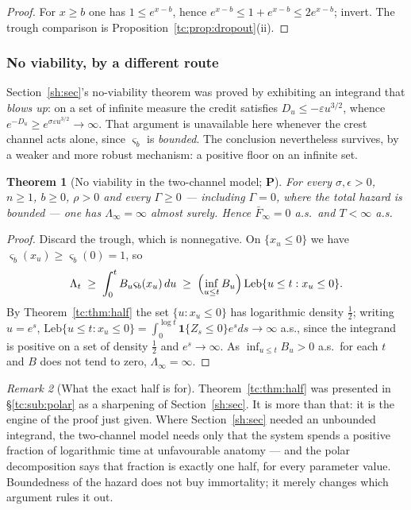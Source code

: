 \documentclass[11pt]{article}
\numberwithin{equation}{section}
\theoremstyle{plain}
\newtheorem{theorem}{Theorem}[section]
\theoremstyle{definition}
\theoremstyle{remark}
\newtheorem{remark}[theorem]{Remark}
\newcommand{\one}{\mathbf{1}}
\begin{document}
\begin{proof}
For $x\ge b$ one has $1\le e^{x-b}$, hence
$e^{x-b}\le1+e^{x-b}\le2e^{x-b}$; invert. The trough comparison is
Proposition~\ref{tc:prop:dropout}(ii).
\end{proof}

\subsubsection{No viability, by a different route}\label{tc:subsub:noviab}

Section~\ref{sh:sec}'s no-viability theorem was proved by exhibiting an integrand
that \emph{blows up}: on a set of infinite measure the credit satisfies
$D_u\le-\varepsilon u^{3/2}$, whence $e^{-D_u}\ge
e^{\sigma\varepsilon u^{3/2}}\to\infty$. That argument is unavailable
here whenever the crest channel acts alone, since $\varsigma_b$ is
\emph{bounded}. The conclusion nevertheless survives, by a weaker and
more robust mechanism: a positive floor on an infinite set.

\begin{theorem}[No viability in the two-channel model; \textbf{P}]
\label{tc:thm:noviab2}
For every $\sigma,\epsilon>0$, $n\ge1$, $b\ge0$, $\rho>0$ and every
$\Gamma\ge0$ --- including $\Gamma=0$, where the total hazard is
bounded --- one has $\Lambda_{\infty}=\infty$ almost surely. Hence
$\bar F_{\infty}=0$ a.s.\ and $T<\infty$ a.s.
\end{theorem}

\begin{proof}
Discard the trough, which is nonnegative. On $\{x_u\le0\}$ we have
$\varsigma_b(x_u)\ge\varsigma_b(0)=1$, so
\[
\Lambda_{t}\;\ge\;\int_{0}^{t}B_u\varsigma_b(x_u)\,du
\;\ge\;\Bigl(\inf_{u\le t}B_u\Bigr)\,
\mathrm{Leb}\{u\le t:x_u\le0\}.
\]
By Theorem~\ref{tc:thm:half} the set $\{u:x_u\le0\}$ has logarithmic
density $\tfrac12$; writing $u=e^{s}$,
$\mathrm{Leb}\{u\le t:x_u\le0\}=\int_{0}^{\log t}\one\{Z_s\le0\}e^{s}ds
\to\infty$ a.s., since the integrand is positive on a set of density
$\tfrac12$ and $e^{s}\to\infty$. As $\inf_{u\le t}B_u>0$ a.s.\ for each
$t$ and $B$ does not tend to zero, $\Lambda_{\infty}=\infty$.
\end{proof}

\begin{remark}[What the exact half is for]\label{tc:rem:halfuse}
Theorem~\ref{tc:thm:half} was presented in \S\ref{tc:sub:polar} as a
sharpening of Section~\ref{sh:sec}. It is more than that: it is the engine of the
proof just given. Where Section~\ref{sh:sec} needed an unbounded integrand,
the two-channel model needs only that the system spends a positive
fraction of logarithmic time at unfavourable anatomy --- and the polar
decomposition says that fraction is exactly one half, for every
parameter value. Boundedness of the hazard does not buy immortality; it
merely changes which argument rules it out.
\end{remark}
\end{document}
